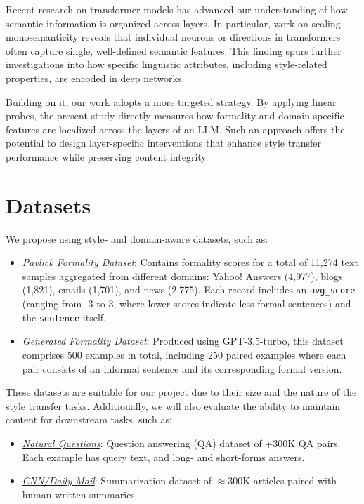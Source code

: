 \documentclass{article}
\begin{document}
Recent research on transformer models has advanced our understanding of how semantic information is organized across layers. In particular, work on scaling monosemanticity \citep{monosemanticity2024} reveals that individual neurons or directions in transformers often capture single, well-defined semantic features. This finding spurs further investigations into how specific linguistic attributes, including style-related properties, are encoded in deep networks.

Building on it, our work adopts a more targeted strategy. By applying linear probes, the present study directly measures how formality and domain-specific features are localized across the layers of an LLM. Such an approach offers the potential to design layer-specific interventions that enhance style transfer performance while preserving content integrity.

\section{Datasets}

We propose using style- and domain-aware datasets, such as:

\begin{itemize}
    \item \href{https://huggingface.co/datasets/osyvokon/pavlick-formality-scores}{\textit{Pavlick Formality Dataset}}: Contains formality scores for a total of 11,274 text samples aggregated from different domains: Yahoo! Answers (4,977), blogs (1,821), emails (1,701), and news (2,775). Each record includes an \texttt{avg\_score} (ranging from -3 to 3, where lower scores indicate less formal sentences) and the \texttt{sentence} itself.
    \item \textit{Generated Formality Dataset}: Produced using GPT-3.5-turbo, this dataset comprises 500 examples in total, including 250 paired examples where each pair consists of an informal sentence and its corresponding formal version.
\end{itemize}

These datasets are suitable for our project due to their size and the nature of the style transfer tasks. Additionally, we will also evaluate the ability to maintain content for downstream tasks, such as:

\begin{itemize}
    \item \href{https://ai.google.com/research/NaturalQuestions}{\textit{Natural Questions}}: Question answering (QA) dataset of +300K QA pairs. Each example has query text, and long- and short-forms answers.
    \item \href{https://github.com/abisee/cnn-dailymail}{\textit{CNN/Daily Mail}}: Summarization dataset of $\approx$300K articles paired with human-written summaries.
\end{itemize}
\end{document}
